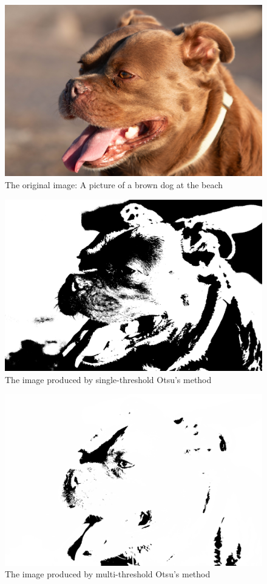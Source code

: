 \documentclass[10pt,twocolumn,letterpaper]{article}
\begin{document}
\begin{figure}[h!]
    \centering
    \includegraphics[width=0.8\linewidth]{port_lobos-8.jpg}
    \caption{The original image: A picture of a brown dog at the beach}
    \label{fig:JPG}
\end{figure}
\begin{figure}[h!]
    \centering
    \includegraphics[width=0.8\linewidth]{otsu_threshold_image.png}
    \caption{The image produced by single-threshold Otsu's method}
    \label{fig:old}
\end{figure}
\begin{figure}[h!]
    \centering
    \includegraphics[width=0.8\linewidth]{multi_threshold_image.png}
    \caption{The image produced by multi-threshold Otsu's method }
    \label{fig:multi}
\end{figure}
\end{document}
